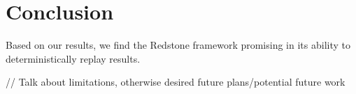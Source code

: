 \section{\txtrsdust Conclusion}

{\fontsize{12}{15}\selectfont 

Based on our results, we find the Redstone framework promising in its ability to deterministically replay results. 

// Talk about limitations, otherwise desired future plans/potential future work

}

% 

